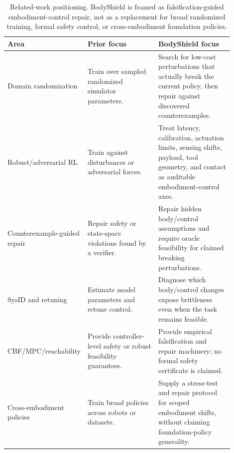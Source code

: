 \begin{table}[t]
\caption{Related-work positioning. BodyShield is framed as falsification-guided embodiment-control repair, not as a replacement for broad randomized training, formal safety control, or cross-embodiment foundation policies.}
\label{tab:related-work-positioning}
\centering
\footnotesize
\begin{tabular}{p{0.18\linewidth}p{0.36\linewidth}p{0.36\linewidth}}
\toprule
Area & Prior focus & BodyShield focus \\
\midrule
Domain randomization & Train over sampled randomized simulator parameters. & Search for low-cost perturbations that actually break the current policy, then repair against discovered counterexamples. \\
Robust/adversarial RL & Train against disturbances or adversarial forces. & Treat latency, calibration, actuation limits, sensing shifts, payload, tool geometry, and contact as auditable embodiment-control axes. \\
Counterexample-guided repair & Repair safety or state-space violations found by a verifier. & Repair hidden body/control assumptions and require oracle feasibility for claimed breaking perturbations. \\
SysID and retuning & Estimate model parameters and retune control. & Diagnose which body/control changes expose brittleness even when the task remains feasible. \\
CBF/MPC/reachability & Provide controller-level safety or robust feasibility guarantees. & Provide empirical falsification and repair machinery; no formal safety certificate is claimed. \\
Cross-embodiment policies & Train broad policies across robots or datasets. & Supply a stress-test and repair protocol for scoped embodiment shifts, without claiming foundation-policy generality. \\
\bottomrule
\end{tabular}
\end{table}
